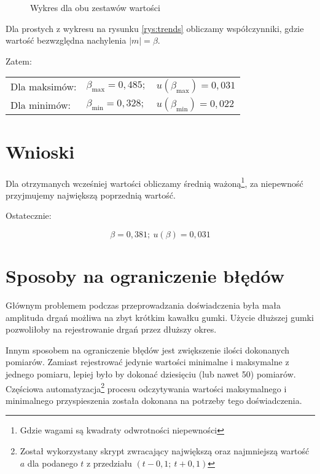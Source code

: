 \documentclass[a4paper,12pt]{article}
\begin{document}
\begin{figure}
	
	\centering
	\caption{Wykres dla obu zestawów wartości}
\end{figure}\label{rys:trends}

Dla prostych z wykresu na rysunku \ref{rys:trends} obliczamy współczynniki, gdzie wartość bezwzględna nachylenia $\left|m\right| = \beta$.

\vspace{5mm}

Zatem:

\vspace{3mm}

\begin{tabular}{lll}
	Dla maksimów:	& $\beta_{\max} = 0,485;$	& $u\left(\beta_{\max}\right) = 0,031$ \\
	Dla minimów:	& $\beta_{\min} = 0,328;$	& $u\left(\beta_{\min}\right) = 0,022$
\end{tabular}

\section{Wnioski}

Dla otrzymanych wcześniej wartości obliczamy średnią ważoną\footnote{Gdzie wagami są kwadraty odwrotności niepewności}, za niepewność przyjmujemy największą poprzednią wartość.

\vspace{5mm}

Ostatecznie:

\[
	\beta = 0,381;\: u\left(\beta\right) = 0,031
\]

\section{Sposoby na ograniczenie błędów}

Głównym problemem podczas przeprowadzania doświadczenia była mała amplituda drgań możliwa na zbyt krótkim kawałku gumki. Użycie dłuższej gumki pozwoliłoby na rejestrowanie drgań przez dłuższy okres.

Innym sposobem na ograniczenie błędów jest zwiększenie ilości dokonanych pomiarów. Zamiast rejestrować jedynie wartości minimalne i maksymalne z jednego pomiaru, lepiej było by dokonać dziesięciu (lub nawet 50) pomiarów. Częściowa automatyzacja\footnote{Został wykorzystany skrypt zwracający największą oraz najmniejszą wartość $a$ dla podanego $t$ z przedziału $\left( t - 0,1;\: t + 0,1 \right)$} procesu odczytywania wartości maksymalnego i minimalnego przyspieszenia została dokonana na potrzeby tego doświadczenia.
\end{document}

